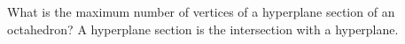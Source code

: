 What is the maximum number of vertices of a hyperplane section of an octahedron? A hyperplane section is the intersection with a hyperplane.
